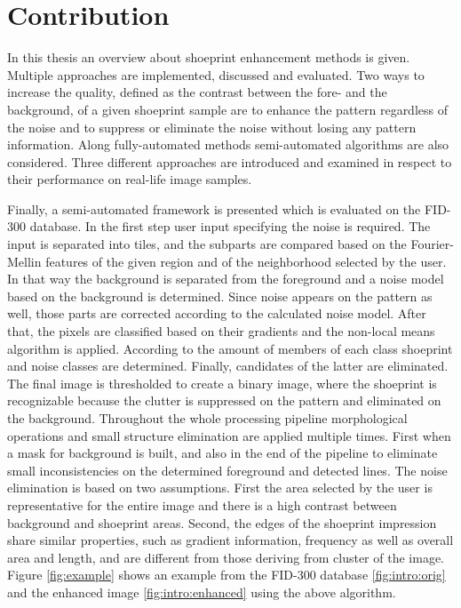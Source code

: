 \documentclass[draft,final]{vutinfth} %
\begin{document}
\section{Contribution}
\par
In this thesis an overview about shoeprint enhancement methods is given.
Multiple approaches are implemented, discussed and evaluated.
Two ways to increase the quality, defined as the contrast between the fore- and the background, of a given shoeprint sample are to enhance the pattern regardless of the noise and to suppress or eliminate the noise without losing any pattern information.
Along fully-automated methods semi-automated algorithms are also considered.
Three different approaches are introduced and examined in respect to their performance on real-life image samples.
\par
Finally, a semi-automated framework is presented which is evaluated on the FID-300 database.
In the first step user input specifying the noise is required.
The input is separated into tiles, and the subparts are compared based on the Fourier-Mellin features of the given region and of the neighborhood selected by the user.
In that way the background is separated from the foreground and a noise model based on the background is determined.
Since noise appears on the pattern as well, those parts are corrected according to the calculated noise model.
After that, the pixels are classified based on their gradients and the non-local means algorithm is applied.
According to the amount of members of each class shoeprint and noise classes are determined.
Finally, candidates of the latter are eliminated.
The final image is thresholded to create a binary image, where the shoeprint is recognizable because the clutter is suppressed on the pattern and eliminated on the background.
Throughout the whole processing pipeline morphological operations and small structure elimination are applied multiple times. 
First when a mask for background is built, and also in the end of the pipeline to eliminate small inconsistencies on the determined foreground and detected lines. 
The noise elimination is based on two assumptions.
First the area selected by the user is representative for the entire image and there is a high contrast between background and shoeprint areas.
Second, the edges of the shoeprint impression share similar properties, such as gradient information, frequency as well as overall area and length, and are different from those deriving from cluster of the image.
Figure \ref{fig:example} shows an example from the FID-300 database \ref{fig:intro:orig} and the enhanced image \ref{fig:intro:enhanced} using the above algorithm.
\end{document}
